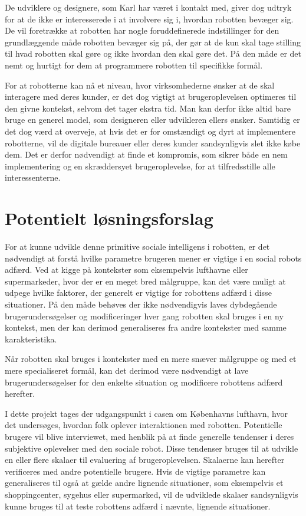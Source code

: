 De udviklere og designere, som Karl har været i kontakt med, giver dog udtryk for at de ikke er interesserede i at involvere sig i, hvordan robotten bevæger sig. De vil foretrække at robotten har nogle foruddefinerede indstillinger for den grundlæggende måde robotten bevæger sig på, der gør at de kun skal tage stilling til hvad robotten skal gøre og ikke hvordan den skal gøre det. På den måde er det nemt og hurtigt for dem at programmere robotten til specifikke formål.

For at robotterne kan nå et niveau, hvor virksomhederne ønsker at de skal interagere med deres kunder, er det dog vigtigt at brugeroplevelsen optimeres til den givne kontekst, selvom det tager ekstra tid. Man kan derfor ikke altid bare bruge en generel model, som designeren eller udvikleren ellers ønsker. Samtidig er det dog værd at overveje, at hvis det er for omstændigt og dyrt at implementere robotterne, vil de digitale bureauer eller deres kunder sandsynligvis slet ikke købe dem. Det er derfor nødvendigt at finde et kompromis, som sikrer både en nem implementering og en skræddersyet brugeroplevelse, for at tilfredsstille alle interessenterne. 

\section{Potentielt løsningsforslag}
\label{PotentieltLoesningsforslag}
%
For at kunne udvikle denne primitive sociale intelligens i robotten, er det nødvendigt at forstå hvilke parametre brugeren mener er vigtige i en social robots adfærd. Ved at kigge på kontekster som eksempelvis lufthavne eller supermarkeder, hvor der er en meget bred målgruppe, kan det være muligt at udpege hvilke faktorer, der generelt er vigtige for robottens adfærd i disse situationer. På den måde behøves der ikke nødvendigvis laves dybdegående brugerundersøgelser og modificeringer hver gang robotten skal bruges i en ny kontekst, men der kan derimod generaliseres fra andre kontekster med samme karakteristika.

Når robotten skal bruges i kontekster med en mere snæver målgruppe og med et mere specialiseret formål, kan det derimod være nødvendigt at lave brugerundersøgelser for den enkelte situation og modificere robottens adfærd herefter. 

I dette projekt tages der udgangspunkt i casen om Københavns lufthavn, hvor det undersøges, hvordan folk oplever interaktionen med robotten. Potentielle brugere vil blive interviewet, med henblik på at finde generelle tendenser i deres subjektive oplevelser med den sociale robot. Disse tendenser bruges til at udvikle en eller flere skalaer til evaluering af brugeroplevelsen. Skalaerne kan herefter verificeres med andre potentielle brugere. Hvis de vigtige parametre kan generaliseres til også at gælde andre lignende situationer, som eksempelvis et shoppingcenter, sygehus eller supermarked, vil de udviklede skalaer sandsynligvis kunne bruges til at teste robottens adfærd i nævnte, lignende situationer.

